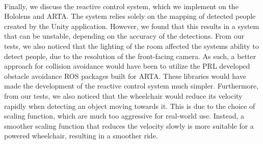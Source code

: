 \paragraph{}Finally, we discuss the reactive control system, which we implement on the Hololens and ARTA. The system relies solely on the mapping of detected people created by the Unity application. However, we found that this results in a system that can be unstable, depending on the accuracy of the detections. From our tests, we also noticed that the lighting of the room affected the systems ability to detect people, due to the resolution of the front-facing camera. As such, a better approach for collision avoidance would have been to utilize the PRL developed obstacle avoidance ROS packages built for ARTA. These libraries would have made the development of the reactive control system much simpler. Furthermore, from our tests, we also noticed that the wheelchair would reduce its velocity rapidly when detecting an object moving towards it. This is due to the choice of scaling function, which are much too aggressive for real-world use. Instead, a smoother scaling function that reduces the velocity slowly is more suitable for a powered wheelchair, resulting in a smoother ride.
